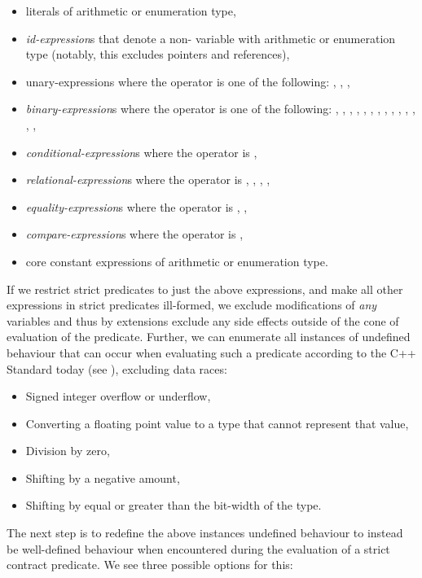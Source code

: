 \begin{itemize}
\item literals of arithmetic or enumeration type,
\item \emph{id-expression}s that denote a non- variable with arithmetic or enumeration type (notably, this excludes pointers and references),
\item unary-expressions where the operator is one of the following: \tcode{+}, \tcode{-}, \tcode{!}, \tcode{~}
\item \emph{binary-expression}s where the operator is one of the following: \tcode{+}, \tcode{-}, \tcode{/}, \tcode{\%}, \tcode{*}, \tcode{!}, \tcode{~}, \tcode{\^}, \tcode{|}, \tcode{||}, \tcode{\&}, \tcode{\&\&}, \tcode{<<}, \tcode{>>},
\item \emph{conditional-expression}s where the operator is ,
\item \emph{relational-expression}s where the operator is \tcode{<}, \tcode{>}, \tcode{<=}, \tcode{>=},
\item \emph{equality-expression}s where the operator is \tcode{==}, \tcode{!=},
\item \emph{compare-expression}s where the operator is \tcode{<=>},
\item core constant expressions of arithmetic or enumeration type.
\end{itemize}

If we restrict strict predicates to just the above expressions, and make all other expressions in strict predicates ill-formed, we exclude modifications of \emph{any} variables and thus by extensions exclude any side effects outside of the cone of evaluation of the predicate. Further, we can enumerate all instances of undefined behaviour that can occur when evaluating such a predicate according to the C++ Standard today (see \cite{P1705R1}), excluding data races:

\begin{itemize}
\item Signed integer overflow or underflow,
\item Converting a floating point value to a type that cannot represent that value,
\item Division by zero,
\item Shifting by a negative amount,
\item Shifting by equal or greater than the bit-width of the type.
\end{itemize}

The next step is to redefine the above instances undefined behaviour to instead be well-defined behaviour when encountered during the evaluation of a strict contract predicate. We see three possible options for this:

